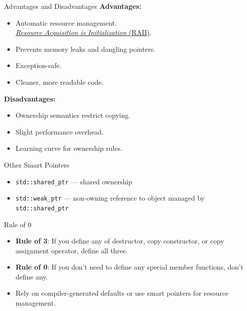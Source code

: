 \documentclass[14pt,aspectratio=1610]{beamer}
\begin{document}
\begin{frame}{Advantages and Disadvantages}
    \textbf{Advantages:}
    \vspace{-0.5em}
    \begin{itemize}
      \item Automatic resource management.\\
        \href{https://en.cppreference.com/w/cpp/language/raii.html}{\textit{Resource Acquisition is Initialization} (RAII)}.
      \item Prevents memory leaks and dangling pointers.
      \item Exception-safe.
      \item Cleaner, more readable code.
    \end{itemize}
    \pause{}
    \textbf{Disadvantages:}
    \vspace{-0.5em}
    \begin{itemize}
      \item Ownership semantics restrict copying.
      \item Slight performance overhead.
      \item Learning curve for ownership rules.
    \end{itemize}
\end{frame}

\begin{frame}{Other Smart Pointers}
\begin{itemize}
  \setlength\itemsep{0.5em}
  \item \lstinline{std::shared_ptr} --- shared ownership
  \item \lstinline{std::weak_ptr} --- non-owning reference to object managed by \lstinline{std::shared_ptr}
\end{itemize}
\end{frame}

\begin{frame}{Rule of 0}
\begin{itemize}[<+->]
  \item \textbf{Rule of 3}: If you define any of destructor, copy constructor, or copy assignment operator, define all three.
  \item \textbf{Rule of 0}: If you don't need to define any special member functions, don't define any.
  \item Rely on compiler-generated defaults or use smart pointers for resource management.
\end{itemize}

\end{frame}
\end{document}
